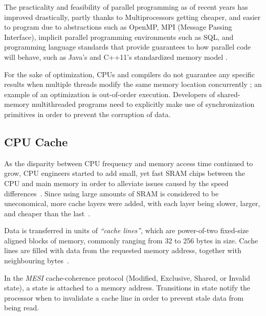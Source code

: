 The practicality and feasibility of parallel programming as of recent years has
improved drastically, partly thanks to Multiprocessors getting cheaper, and
easier to program due to abstractions such as OpenMP, MPI (Message Passing
Interface), implicit parallel programming environments such as SQL, and
programming language standards that provide guarantees to how parallel code will
behave, such as Java's\cite{javamemorymodel2014} and C++11's
\cite{cppmemorymodel} standardized memory model
\cite[Chapter~2.2]{perfbook2021}.

For the sake of optimization, CPUs and compilers do not guarantee any specific
results when multiple threads modify the same memory location concurrently
\cite{drepper2007every}; an example of an optimization is out-of-order
execution\cite[Appendix~B.7.1]{perfbook2021}. Developers of shared-memory
multithreaded programs need to explicitly make use of synchronization
primitives in order to prevent the corruption of data.

\subsection{CPU Cache}
As the disparity between CPU frequency and memory access time continued to
grow, CPU engineers started to add small, yet fast SRAM chips between the CPU
and main memory in order to alleviate issues caused by the speed
differences~\cite{cantrill2008real,drepper2007every,perfbook2021}. Since
using large amounts of SRAM is considered to be uneconomical, more cache layers
were added, with each layer being slower, larger, and cheaper than the
last~\cite{drepper2007every,perfbook2021}.

Data is transferred in units of \emph{``cache lines''}, which are power-of-two
fixed-size aligned blocks of memory, commonly ranging from 32 to 256 bytes in
size. Cache lines are filled with data from the requested memory address,
together with neighbouring bytes~\cite[Section~3.2.1]{perfbook2021}.


In the \emph{MESI} cache-coherence protocol (Modified, Exclusive, Shared,
or Invalid state), a state is attached to a memory address. Transitions in
state notify the processor when to invalidate a cache line in order to prevent
stale data from being read.

